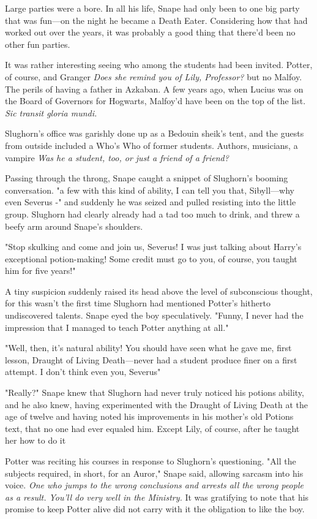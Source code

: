 Large parties were a bore. In all his life, Snape had only been to one big party that was fun—on the night he became a Death Eater. Considering how that had worked out over the years, it was probably a good thing that there'd been no other fun parties.

It was rather interesting seeing who among the students had been invited. Potter, of course, and Granger{\el} \emph{Does she remind you of Lily, Professor?{\el}} but no Malfoy. The perils of having a father in Azkaban. A few years ago, when Lucius was on the Board of Governors for Hogwarts, Malfoy'd have been on the top of the list. \emph{Sic transit gloria mundi.}

Slughorn's office was garishly done up as a Bedouin sheik's tent, and the guests from outside included a Who's Who of former students. Authors, musicians, a vampire{\el} \emph{Was he a student, too, or just a friend of a friend?}

Passing through the throng, Snape caught a snippet of Slughorn's booming conversation. "{\el}a few with this kind of ability, I can tell you that, Sibyll—why even Severus -" and suddenly he was seized and pulled resisting into the little group. Slughorn had clearly already had a tad too much to drink, and threw a beefy arm around Snape's shoulders.

"Stop skulking and come and join us, Severus! I was just talking about Harry's exceptional potion-making! Some credit must go to you, of course, you taught him for five years!"

A tiny suspicion suddenly raised its head above the level of subconscious thought, for this wasn't the first time Slughorn had mentioned Potter's hitherto undiscovered talents. Snape eyed the boy speculatively. "Funny, I never had the impression that I managed to teach Potter anything at all."

"Well, then, it's natural ability! You should have seen what he gave me, first lesson, Draught of Living Death—never had a student produce finer on a first attempt. I don't think even you, Severus{\el}"

"Really?" Snape knew that Slughorn had never truly noticed his potions ability, and he also knew, having experimented with the Draught of Living Death at the age of twelve and having noted his improvements in his mother's old Potions text, that no one had ever equaled him. Except Lily, of course, after he taught her how to do it{\el}

Potter was reciting his courses in response to Slughorn's questioning. "All the subjects required, in short, for an Auror," Snape said, allowing sarcasm into his voice. \emph{One who jumps to the wrong conclusions and arrests all the wrong people as a result. You'll do very well in the Ministry.} It was gratifying to note that his promise to keep Potter alive did not carry with it the obligation to like the boy.

